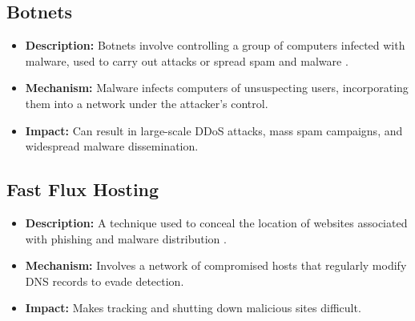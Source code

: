 \subsection{Botnets}
\begin{itemize}
    \item \textbf{Description:} Botnets involve controlling a group of computers infected with malware, used to carry out attacks or spread spam and malware \cite{citpyour}.
    \item \textbf{Mechanism:} Malware infects computers of unsuspecting users, incorporating them into a network under the attacker's control.
    \item \textbf{Impact:} Can result in large-scale DDoS attacks, mass spam campaigns, and widespread malware dissemination.
\end{itemize}

\subsection{Fast Flux Hosting}
\begin{itemize}
    \item \textbf{Description:} A technique used to conceal the location of websites associated with phishing and malware distribution \cite{lin2013genetic}.
    \item \textbf{Mechanism:} Involves a network of compromised hosts that regularly modify DNS records to evade detection.
    \item \textbf{Impact:} Makes tracking and shutting down malicious sites difficult.
\end{itemize}


